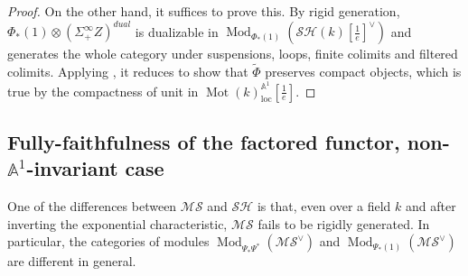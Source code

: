 \documentclass{article}
\theoremstyle{definition}
\newcommand{\on}{\operatorname}
\begin{document}
\begin{proof}
On the other hand, it suffices to prove this. By rigid generation, $\Phi_\ast(1)\otimes(\Sigma^\infty_+ Z)^{dual}$ is dualizable in $\on{Mod}_{\Phi_\ast(1)}(\mathcal{SH}(k)[\frac{1}{e}]^{\vee})$ and generates the whole category under suspensions, loops, finite colimits and filtered colimits. Applying \cite[Proposition 2.7]{Rob}, it reduces to show that $\widetilde{\Phi}$ preserves compact objects, which is true by the compactness of unit in $\on{Mot}(k)_{\on{loc}}^{\mathbb{A}^1}[\frac{1}{e}]$.
\end{proof}





\subsection{Fully-faithfulness of the factored functor, non-$\mathbb{A}^1$-invariant case}\label{comparison.MS}
One of the differences between $\mathcal{MS}$ and $\mathcal{SH}$ is that, even over a field $k$ and after inverting the exponential characteristic, $\mathcal{MS}$ fails to be rigidly generated. In particular, the categories of modules $\on{Mod}_{\Psi_\ast\Psi^\ast}(\mathcal{MS}^\vee)$ and $\on{Mod}_{\Psi_\ast(1)}(\mathcal{MS}^\vee)$ are different in general. 
\end{document}
